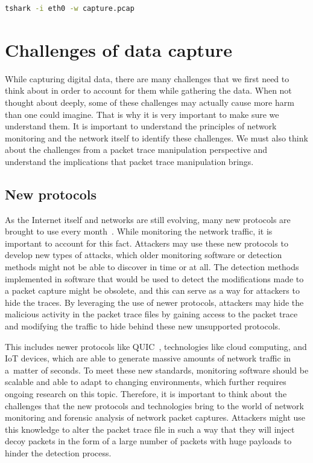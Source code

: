 \documentclass[
  printed,     %
  color,       %
  oneside,     %
  nosansbold,  %
  nocolorbold, %
  nolof,         %
  nolot,         %
]{fithesis4}
\begin{document}
\begin{lstlisting}[language=bash, caption={Save capture to pcap file}, label={lst:tsharksave}]
tshark -i eth0 -w capture.pcap
\end{lstlisting}



\section{Challenges of data capture}

While capturing digital data, there are many challenges that we first need to think about in order to account for them while gathering the data. When not thought about deeply, some of these challenges may actually cause more harm than one could imagine. That is why it is very important to make sure we understand them. It is important to understand the principles of network monitoring and the network itself to identify these challenges. We must also think about the challenges from a packet trace manipulation perspective and understand the implications that packet trace manipulation brings.

\subsection{New protocols}

As the Internet itself and networks are still evolving, many new protocols are brought to use every month~\cite{Examinin23:online}. While monitoring the network traffic, it is important to account for this fact. Attackers may use these new protocols to develop new types of attacks, which older monitoring software or detection methods might not be able to discover in time or at all. The detection methods implemented in software that would be used to detect the modifications made to a packet capture might be obsolete, and this can serve as a way for attackers to hide the traces. By leveraging the use of newer protocols, attackers may hide the malicious activity in the packet trace files by gaining access to the packet trace and modifying the traffic to hide behind these new unsupported protocols.

This includes newer protocols like QUIC~\cite{RFC9000}, technologies like cloud computing, and IoT devices, which are able to generate massive amounts of network traffic in a~matter of seconds. To meet these new standards, monitoring software should be scalable and able to adapt to changing environments, which further requires ongoing research on this topic. Therefore, it is important to think about the challenges that the new protocols and technologies bring to the world of network monitoring and forensic analysis of network packet captures. Attackers might use this knowledge to alter the packet trace file in such a way that they will inject decoy packets in the form of a large number of packets with huge payloads to hinder the detection process.
\end{document}
